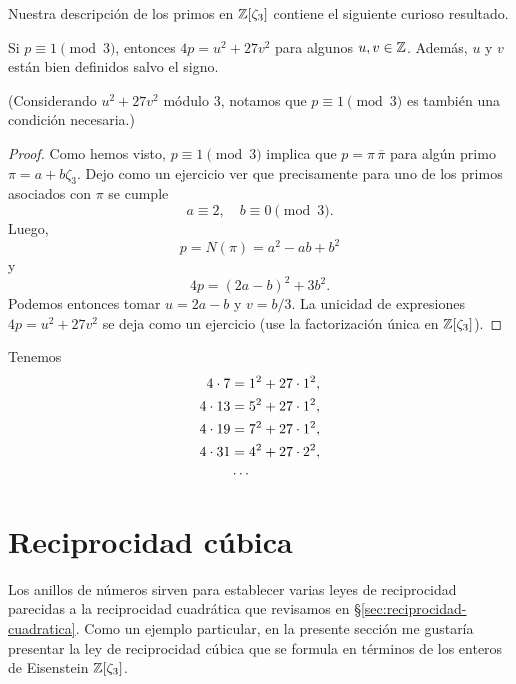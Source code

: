 Nuestra descripción de los primos en $\mathbb{Z} [\zeta_3]$ contiene el siguiente
curioso resultado.

\begin{proposicion}
  Si $p \equiv 1 \pmod{3}$, entonces $4p = u^2 + 27 v^2$ para algunos
  $u,v \in \mathbb{Z}$. Además, $u$ y $v$ están bien definidos salvo el signo.
\end{proposicion}

(Considerando $u^2 + 27 v^2$ módulo $3$, notamos que $p \equiv 1 \pmod{3}$
es también una condición necesaria.)

\begin{proof}
  Como hemos visto, $p \equiv 1 \pmod{3}$ implica que $p = \pi\,\overline{\pi}$
  para algún primo $\pi = a + b\zeta_3$. Dejo como un ejercicio ver que
  precisamente para uno de los primos asociados con $\pi$ se cumple
  $$a \equiv 2, \quad b \equiv 0 \pmod{3}.$$
  Luego,
  $$p = N (\pi) = a^2 - ab + b^2$$
  y
  $$4p = (2a - b)^2 + 3b^2.$$
  Podemos entonces tomar $u = 2a - b$ y $v = b/3$. La unicidad de expresiones
  $4p = u^2 + 27 v^2$ se deja como un ejercicio (use la factorización única en
  $\mathbb{Z} [\zeta_3]$).
\end{proof}

\begin{ejemplo}
  Tenemos
  \begin{align*}
    4\cdot 7 & = 1^2 + 27\cdot 1^2,\\
    4\cdot 13 & = 5^2 + 27\cdot 1^2,\\
    4\cdot 19 & = 7^2 + 27\cdot 1^2,\\
    4\cdot 31 & = 4^2 + 27\cdot 2^2,\\
    & \cdots \qedhere
  \end{align*}
\end{ejemplo}


\section{Reciprocidad cúbica}

Los anillos de números sirven para establecer varias leyes de reciprocidad
parecidas a la reciprocidad cuadrática que revisamos en
\S\ref{sec:reciprocidad-cuadratica}. Como un ejemplo particular, en la presente
sección me gustaría presentar la ley de reciprocidad cúbica que se formula en
términos de los enteros de Eisenstein $\mathbb{Z} [\zeta_3]$.

